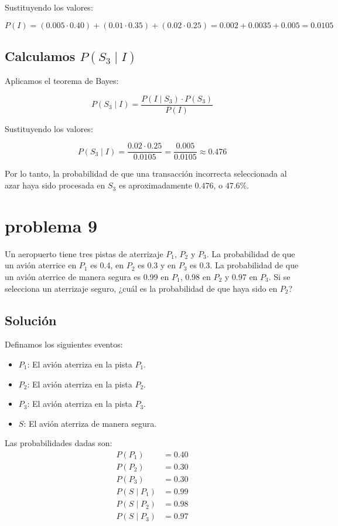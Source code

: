\documentclass[12pt,a4paper]{article}
\begin{document}
Sustituyendo los valores:

\[
P(I) = (0.005 \cdot 0.40) + (0.01 \cdot 0.35) + (0.02 \cdot 0.25) = 0.002 + 0.0035 + 0.005 = 0.0105
\]

\subsection*{ Calculamos \( P(S_3 \mid I) \)}

Aplicamos el teorema de Bayes:

\[
P(S_3 \mid I) = \frac{P(I \mid S_3) \cdot P(S_3)}{P(I)}
\]

Sustituyendo los valores:

\[
P(S_3 \mid I) = \frac{0.02 \cdot 0.25}{0.0105} = \frac{0.005}{0.0105} \approx 0.476
\]

Por lo tanto, la probabilidad de que una transacción incorrecta seleccionada al azar haya sido procesada en \( S_3 \) es aproximadamente \( 0.476 \), o \( 47.6\% \).

\section*{problema 9}
Un aeropuerto tiene tres pistas de aterrizaje \( P_1 \), \( P_2 \) y \( P_3 \). La probabilidad de que un avión aterrice en \( P_1 \) es 0.4, en \( P_2 \) es 0.3 y en \( P_3 \) es 0.3. La probabilidad de que un avión aterrice de manera segura es 0.99 en \( P_1 \), 0.98 en \( P_2 \) y 0.97 en \( P_3 \). Si se selecciona un aterrizaje seguro, ¿cuál es la probabilidad de que haya sido en \( P_2 \)?

\subsection*{Solución}

Definamos los siguientes eventos:
\begin{itemize}
    \item \( P_1 \): El avión aterriza en la pista \( P_1 \).
    \item \( P_2 \): El avión aterriza en la pista \( P_2 \).
    \item \( P_3 \): El avión aterriza en la pista \( P_3 \).
    \item \( S \): El avión aterriza de manera segura.
\end{itemize}

Las probabilidades dadas son:
\begin{align*}
P(P_1) &= 0.40 \\
P(P_2) &= 0.30 \\
P(P_3) &= 0.30 \\
P(S \mid P_1) &= 0.99 \\
P(S \mid P_2) &= 0.98 \\
P(S \mid P_3) &= 0.97
\end{align*}
\end{document}
